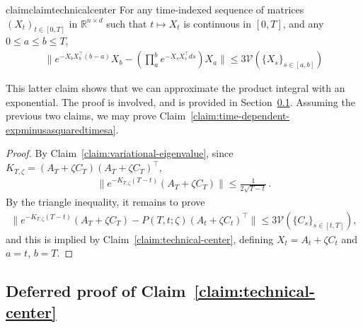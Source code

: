 \documentclass[11pt]{article} %
\newcommand{\R}{\mathbb{R}}
\newcommand{\<}{\langle}
\renewcommand{\>}{\rangle}
\def\cV{{\mathcal V}}
\def\cV{{\mathcal V}}
\def\cV{{\mathcal V}}
\theoremstyle{plain}
\theoremstyle{definition}
\theoremstyle{remark}
\begin{document}
\begin{restatable}{claim}{claimtechnicalcenter}
\label{claim:technical-center}
For any time-indexed sequence of matrices $(X_t)_{t \in [0,T]}$ in $\R^{n \times d}$ such that $t \mapsto X_t$ is continuous in $[0,T]$, and any $0 \leq a \leq b \leq T$,
\begin{align*}
\|e^{-X_bX_b^{\top} (b-a)} X_b - \left(\prod_{a}^b e^{-X_s X_s^{\top} ds}\right) X_a\| \leq 3 \cV(\{X_s\}_{s \in [a,b]})
\end{align*}
\end{restatable}
This latter claim shows that we can approximate the product integral with an exponential. The proof is involved, and is provided in Section~\ref{ssec:technical-center}. Assuming the previous two claims, we may prove Claim~\ref{claim:time-dependent-expminusasquaredtimesa}.

\claimproductintegraltimesmatrix*
\begin{proof}
By Claim~\ref{claim:variational-eigenvalue}, since $K_{T,\zeta} = (A_T + \zeta C_T)(A_T + \zeta C_T)^{\top}$,
\begin{align*}
\|e^{-K_{T, \zeta }(T-t)}(A_T +  \zeta C_T)\| \leq \frac{1}{2\sqrt{T-t}}\,.
\end{align*}
By the triangle inequality, it remains to prove 
\begin{align*}
\|e^{-K_{T, \zeta }(T-t)} (A_T +  \zeta C_T) - P(T,t; \zeta )(A_t +  \zeta C_t)^{\top}\| \leq 3 \cV(\{C_s\}_{s \in [t,T]}),
\end{align*}
and this is implied by Claim~\ref{claim:technical-center}, defining $X_t = A_t + \zeta C_t$ and $a = t$, $b = T$.
\end{proof}


\subsection{Deferred proof of Claim~\ref{claim:technical-center}}\label{ssec:technical-center}
\end{document}
